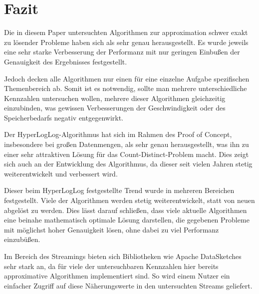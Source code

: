\section{Fazit}

Die in diesem Paper untersuchten Algorithmen zur approximation schwer exakt zu lösender Probleme haben sich als sehr genau herausgestellt.
Es wurde jeweils eine sehr starke Verbesserung der Performanz mit nur geringen Einbußen der Genauigkeit des Ergebnisses festgestellt.

Jedoch decken alle Algorithmen nur einen für eine einzelne Aufgabe spezifischen Themenbereich ab.
Somit ist es notwendig, sollte man mehrere unterschiedliche Kennzahlen untersuchen wollen, mehrere dieser Algorithmen gleichzeitig einzubinden, was gewissen Verbesserungen der Geschwindigkeit oder des Speicherbedarfs negativ entgegenwirkt.

Der HyperLogLog-Algorithmus hat sich im Rahmen des Proof of Concept, insbesondere bei großen Datenmengen, als sehr genau herausgestellt, was ihn zu einer sehr attraktiven Lösung für das Count-Distinct-Problem macht.
Dies zeigt sich auch an der Entwicklung des Algorithmus, da dieser seit vielen Jahren stetig weiterentwickelt und verbessert wird.

Dieser beim HyperLogLog festgestellte Trend wurde in mehreren Bereichen festgestellt.
Viele der Algorithmen werden stetig weiterentwickelt, statt von neuen abgelöst zu werden.
Dies lässt darauf schließen, dass viele aktuelle Algorithmen eine beinahe mathematisch optimale Lösung darstellen, die gegebenen Probleme mit möglichst hoher Genauigkeit lösen, ohne dabei zu viel Performanz einzubüßen.

Im Bereich des Streamings bieten sich Bibliotheken wie Apache DataSketches sehr stark an, da für viele der untersuchbaren Kennzahlen hier bereits approximative Algorithmen implementiert sind.
So wird einem Nutzer ein einfacher Zugriff auf diese Näherungswerte in den untersuchten Streams geliefert.